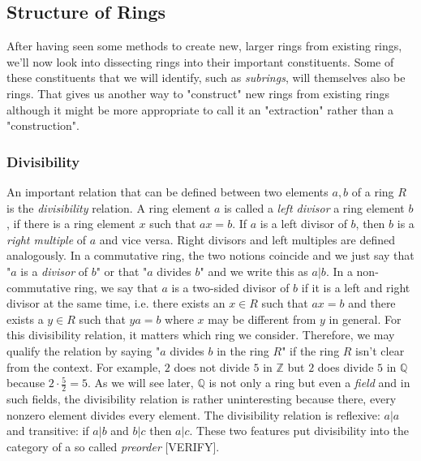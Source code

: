 \subsection{Structure of Rings}
After having seen some methods to create new, larger rings from existing rings, we'll now look into dissecting rings into their important constituents. Some of these constituents that we will identify, such as \emph{subrings}, will themselves also be rings. That gives us another way to "construct" new rings from existing rings although it might be more appropriate to call it an "extraction" rather than a "construction".


\subsubsection{Divisibility}
An important relation that can be defined between two elements $a,b$ of a ring $R$ is the \emph{divisibility} relation. A ring element $a$ is called a \emph{left divisor} a ring element $b$, if there is a ring element $x$ such that $a x = b$. If $a$ is a left divisor of $b$, then $b$ is a \emph{right multiple} of $a$ and vice versa. Right divisors and left multiples are defined analogously. In a commutative ring, the two notions coincide and we just say that "$a$ is a \emph{divisor} of $b$" or that "$a$ divides $b$" and we write this as $a|b$. In a non-commutative ring, we say that $a$ is a two-sided divisor of $b$ if it is a left and right divisor at the same time, i.e. there exists an $x \in R$ such that $a x = b$ and there exists a $y \in R$ such that $y a = b$ where $x$ may be different from $y$ in general. For this divisibility relation, it matters which ring we consider. Therefore, we may qualify the relation by saying "$a$ divides $b$ in the ring $R$" if the ring $R$ isn't clear from the context. For example, $2$ does not divide $5$ in $\mathbb{Z}$ but $2$ does divide $5$ in $\mathbb{Q}$ because $2 \cdot \frac{5}{2} = 5$. As we will see later, $\mathbb{Q}$ is not only a ring but even a \emph{field} and in such fields, the divisibility relation is rather uninteresting because there, every nonzero element divides every element. The divisibility relation is reflexive: $a|a$ and transitive: if $a|b$ and $b|c$ then $a|c$. These two features put divisibility into the category of a so called \emph{preorder} [VERIFY]. 


